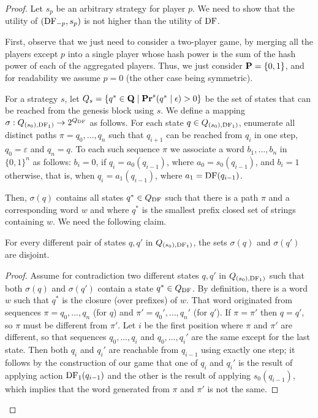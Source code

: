 \begin{proof}
Let $s_p$ be an arbitrary strategy for player $p$. We need to show that the utility of $(\text{\rm DF}_{-p},s_p)$ is not higher than the utility of $\text{\rm DF}$. 

First, observe that we just need to consider a two-player game, by merging all the players except $p$ into a single player whose hash power is the sum of the hash power 
of each of the aggregated players. Thus, we just consider $\mathbf{P} = \{0,1\}$, and for readability we assume $p = 0$ (the other case being symmetric). 

For a strategy $s$, let $Q_s = \{q^* \in \mathbf{Q} \mid \mathbf{Pr}^s(q^* \mid \epsilon) > 0\}$ be the set of states that can be reached from the genesis block using $s$. 
We define a mapping $\sigma: Q_{(s_0),\text{\rm DF}_1)} \rightarrow 2^{Q_{\text{\rm DF}}}$ as follows. 
For each state $q \in Q_{(s_0),\text{\rm DF}_1)}$, enumerate all distinct paths $\pi = q_0,\dots,q_n$ such that $q_{i+1}$ can be reached from 
$q_i$ in one step, $q_0 = \varepsilon$ and $q_n = q$. To each such sequence $\pi$ we associate a word $b_1,\dots,b_n$ in $\{0,1\}^n$ as follows: 
$b_i = 0$, if $q_{i} = a_0(q_{i-1})$, where $a_0 = s_0(q_{i-1})$, and $b_i = 1$ otherwise, that is, when  $q_{i} = a_1(q_{i-1})$, where $a_1 = \text{\rm DF}(q_{i-1})$. 

Then, $\sigma(q)$ contains all states $q^* \in Q_{\text{\rm DF}}$ such that there is a path $\pi$ and a corresponding word $w$ and where 
$q^*$ is the smallest prefix closed set of strings containing $w$. We need the following claim. 

\begin{myclaim}
\label{claim-nonempty-inter}
For every different pair of states $q,q'$ in $Q_{(s_0),\text{\rm DF}_1)}$, the sets $\sigma(q)$ and $\sigma(q')$ are disjoint. 
\end{myclaim}

\begin{proof}
Assume for contradiction two different  states $q,q'$ in $Q_{(s_0),\text{\rm DF}_1)}$ such that both $\sigma(q)$ and $\sigma(q')$ contain a state $q^* \in Q_{\text{\rm DF}}$. By definition, there is a word 
$w$ such that $q^*$ is the closure (over prefixes) of $w$. That word originated from sequences $\pi = q_0,\dots,q_n$ (for $q$) and $\pi' = q_0',\dots,q_n'$ (for $q'$). If 
$\pi = \pi'$ then $q = q'$, so $\pi$ must be different from $\pi'$. Let $i$ be the first position where $\pi$ and $\pi'$ are different, so that 
sequences $q_0,\dots,q_i$ and $q_0,\dots,q_i'$ are the same except for the last state. Then both $q_i$ and $q_i'$ are reachable from $q_{i-1}$ using exactly one step; it follows 
by the construction of our game that one of $q_i$ and $q_i'$ is the result of applying action $\text{\rm DF}_1(q_{i-1})$ and the other is the result of applying $s_0(q_{i-1})$, which implies that 
the word generated from $\pi$ and $\pi'$ is not the same. 
\end{proof}


\end{proof}
